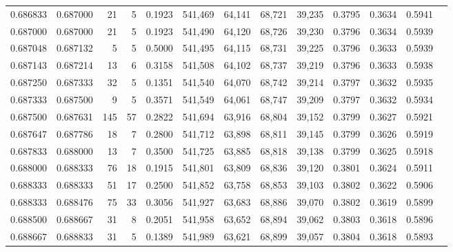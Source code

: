 \begin{tabular}{rrrrrrrrrrrrr}
0.686833 & 0.687000 &    21 &   5 &                                     0.1923 & 541,469 &  64,141 &  68,721 &  39,235 & 0.3795 & 0.3634 & 0.5941 \\
0.687000 & 0.687000 &    21 &   5 &                                     0.1923 & 541,490 &  64,120 &  68,726 &  39,230 & 0.3796 & 0.3634 & 0.5939 \\
0.687048 & 0.687132 &     5 &   5 &                                     0.5000 & 541,495 &  64,115 &  68,731 &  39,225 & 0.3796 & 0.3633 & 0.5939 \\
0.687143 & 0.687214 &    13 &   6 &                                     0.3158 & 541,508 &  64,102 &  68,737 &  39,219 & 0.3796 & 0.3633 & 0.5938 \\
0.687250 & 0.687333 &    32 &   5 &                                     0.1351 & 541,540 &  64,070 &  68,742 &  39,214 & 0.3797 & 0.3632 & 0.5935 \\
0.687333 & 0.687500 &     9 &   5 &                                     0.3571 & 541,549 &  64,061 &  68,747 &  39,209 & 0.3797 & 0.3632 & 0.5934 \\
0.687500 & 0.687631 &   145 &  57 &                                     0.2822 & 541,694 &  63,916 &  68,804 &  39,152 & 0.3799 & 0.3627 & 0.5921 \\
0.687647 & 0.687786 &    18 &   7 &                                     0.2800 & 541,712 &  63,898 &  68,811 &  39,145 & 0.3799 & 0.3626 & 0.5919 \\
0.687833 & 0.688000 &    13 &   7 &                                     0.3500 & 541,725 &  63,885 &  68,818 &  39,138 & 0.3799 & 0.3625 & 0.5918 \\
0.688000 & 0.688333 &    76 &  18 &                                     0.1915 & 541,801 &  63,809 &  68,836 &  39,120 & 0.3801 & 0.3624 & 0.5911 \\
0.688333 & 0.688333 &    51 &  17 &                                     0.2500 & 541,852 &  63,758 &  68,853 &  39,103 & 0.3802 & 0.3622 & 0.5906 \\
0.688333 & 0.688476 &    75 &  33 &                                     0.3056 & 541,927 &  63,683 &  68,886 &  39,070 & 0.3802 & 0.3619 & 0.5899 \\
0.688500 & 0.688667 &    31 &   8 &                                     0.2051 & 541,958 &  63,652 &  68,894 &  39,062 & 0.3803 & 0.3618 & 0.5896 \\
0.688667 & 0.688833 &    31 &   5 &                                     0.1389 & 541,989 &  63,621 &  68,899 &  39,057 & 0.3804 & 0.3618 & 0.5893 \\

\end{tabular}
